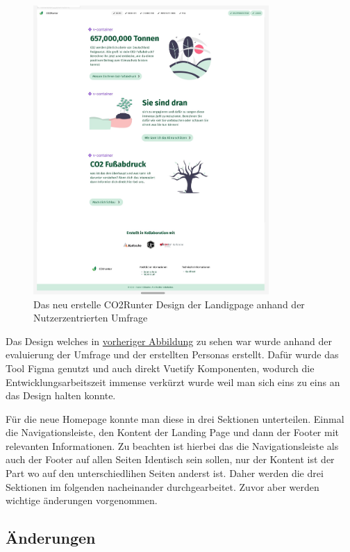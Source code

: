 \begin{figure}[h]
    \centering
    \includegraphics[width=0.8\textwidth]{images/06/HomePage-Design.jpeg}
    \caption{Das neu erstelle CO2Runter Design der Landigpage anhand der Nutzerzentrierten Umfrage}
    \label{fig:new-co2runter-homepage-design}
\end{figure}

Das Design welches in \hyperref[fig:new-co2runter-homepage-design]{vorheriger Abbildung} zu sehen war wurde anhand der evaluierung der Umfrage und der erstellten Personas erstellt. Dafür wurde das Tool Figma genutzt und auch direkt Vuetify Komponenten, wodurch die Entwicklungsarbeitszeit immense verkürzt wurde weil man sich eins zu eins an das Design halten konnte.

Für die neue Homepage konnte man diese in drei Sektionen unterteilen. Einmal die Navigationsleiste, den Kontent der Landing Page und dann der Footer mit relevanten Informationen. Zu beachten ist hierbei das die Navigationsleiste als auch der Footer auf allen Seiten Identisch sein sollen, nur der Kontent ist der Part wo auf den unterschiedlihen Seiten anderst ist. Daher werden die drei Sektionen im folgenden nacheinander durchgearbeitet. Zuvor aber werden wichtige änderungen vorgenommen.

\subsection{Änderungen}


